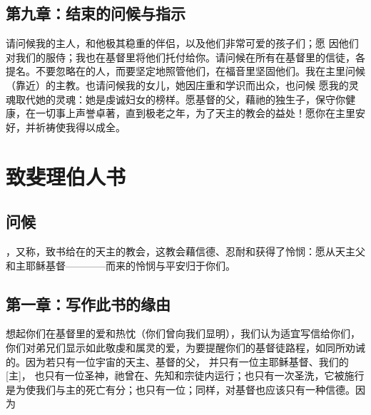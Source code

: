 
\subsection{第九章：结束的问候与指示}

请问候我的主人，和他极其稳重的伴侣，以及他们非常可爱的孩子们；愿 因他们对我们的服侍；我也在基督里将他们托付给你。请问候在所有在基督里的信徒，各提名。不要忽略在的人，而要坚定地照管他们，在福音里坚固他们。我在主里问候（靠近）的主教。也请问候我的女儿，她因庄重和学识而出众，也问候  愿我的灵魂取代她的灵魂：她是虔诚妇女的榜样。愿基督的父，藉祂的独生子，保守你健康，在一切事上声誉卓著，直到极老之年，为了天主的教会的益处！愿你在主里安好，并祈祷使我得以成全。\par


\section{致斐理伯人书}


\subsection{问候}

，又称，致书给在的天主的教会，这教会藉信德、忍耐和获得了怜悯：愿从天主父和主耶稣基督————而来的怜悯与平安归于你们。 \par


\subsection{第一章：写作此书的缘由}

想起你们在基督里的爱和热忱（你们曾向我们显明），我们认为适宜写信给你们，你们对弟兄们显示如此敬虔和属灵的爱，为要提醒你们的基督徒路程，如同所劝诫的。因为若只有一位宇宙的天主、基督的父， 并只有一位主耶稣基督、我们的[主]， 也只有一位圣神，祂曾在、先知和宗徒内运行；也只有一次圣洗，它被施行是为使我们与主的死亡有分；也只有一位；同样，对基督也应该只有一种信德。因为 \par

